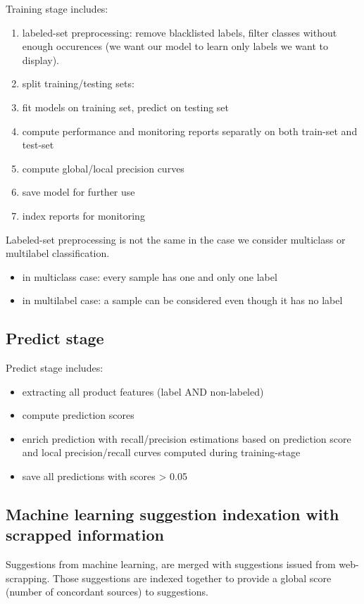 Training stage includes:
\begin{enumerate}
	\item labeled-set preprocessing: remove blacklisted labels, filter classes without enough occurences (we want our model to learn only labels we want to display).
	\item split training/testing sets:
	\item fit models on training set, predict on testing set
	\item compute performance and monitoring reports separatly on both train-set and test-set
	\item compute global/local precision curves
	\item save model for further use
	\item index reports for monitoring
\end{enumerate}

Labeled-set preprocessing is not the same in the case we consider multiclass or multilabel classification.
\begin{itemize}
	\item in multiclass case: every sample has one and only one label
	\item in multilabel case: a sample can be considered even though it has no label
\end{itemize}

\subsection{Predict stage}
Predict stage includes: 
\begin{itemize}
	\item extracting all product features (label AND non-labeled)
	\item compute prediction scores
	\item enrich prediction with recall/precision estimations based on prediction score and local precision/recall curves computed during training-stage
	\item save all predictions with scores > 0.05
\end{itemize}

\subsection{Machine learning suggestion indexation with scrapped information}

Suggestions from machine learning, are merged with suggestions issued from web-scrapping.
Those suggestions are indexed together to provide a global score (number of concordant sources) to suggestions.

